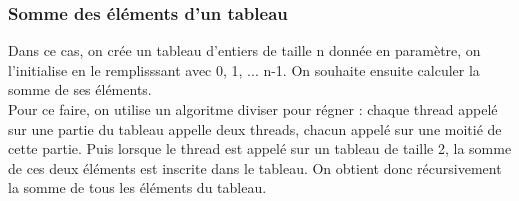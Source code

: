 \begin{center}
\end{center}

\subsubsection{Somme des éléments d'un tableau}
Dans ce cas, on crée un tableau d'entiers de taille n donnée en
paramètre, on l'initialise en le remplisssant avec 0, 1, ... n-1. On
souhaite ensuite calculer la somme de ses éléments.\\ Pour ce faire,
on utilise un algoritme diviser pour régner : chaque thread appelé sur
une partie du tableau appelle deux threads, chacun appelé sur une
moitié de cette partie. Puis lorsque le thread est appelé sur un
tableau de taille 2, la somme de ces deux éléments est inscrite dans
le tableau. On obtient donc récursivement la somme de tous les
éléments du tableau.\\

